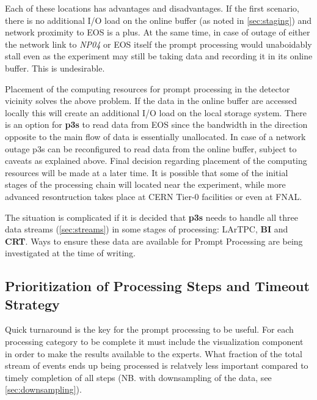 \documentclass[pdftex,12pt,letter]{article}
\newcommand{\expname}{\textit{NP04}\xspace}
\newcommand{\PP}{Prompt Processing\xspace}
\newcommand{\PPS}{\textbf{p3s}\xspace}
\begin{document}
\noindent Each of these locations has advantages and disadvantages. If the first scenario,
there is no additional I/O load on the online buffer (as noted in \ref{sec:staging}) and network proximity
to EOS is a plus. At the same time, in case of outage of either the network link to \expname or EOS itself
the prompt processing would unaboidably stall even as the experiment may still be taking data and recording
it in its online buffer. This is undesirable.

Placement of the computing resources for prompt processing in the detector
vicinity solves the above problem. If the data in the online buffer are accessed locally
this will create an additional I/O load on the local storage system. There is an option for \PPS
to read data from EOS since the bandwidth in the direction opposite to the main flow of data
is essentially unallocated. In case of a network outage p3s can be reconfigured to read
data from the online buffer, subject to caveats as explained above.
Final decision regarding placement of the computing resources will be made at a later time.
It is possible that some of the initial stages of the processing chain will located near the
experiment, while more advanced resontruction takes place at CERN Tier-0 facilities or even at FNAL.

The situation is complicated if it is decided that \PPS needs to handle all three data streams
(\ref{sec:streams}) in some stages of processing: LArTPC, \textbf{BI} and \textbf{CRT}.
Ways to ensure these data are available for \PP are being investigated at the time of writing.

\subsection{Prioritization of Processing Steps and Timeout Strategy}
\label{sec:priority}
Quick turnaround is the key for the prompt processing to be useful. For each processing category
to be complete it must include the visualization component in order to make the results available
to the experts. What fraction of the total stream of events ends up being processed is relatvely less
important compared to timely completion of all steps (NB. with downsampling of the data, see 
\ref{sec:downsampling}).
\end{document}
